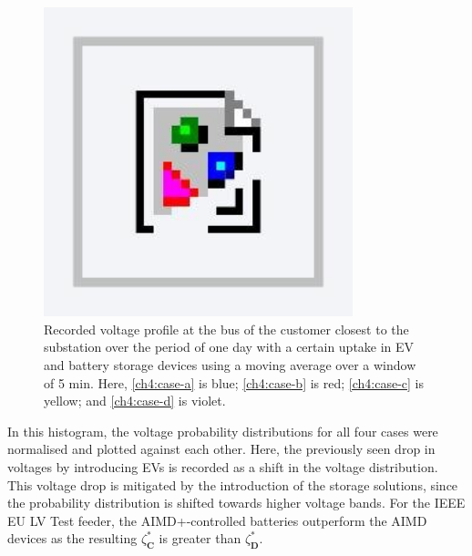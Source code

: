 \begin{figure}\centering
 \includegraphics[width=0.8\textwidth]{foo}
 \caption{Recorded voltage profile at the bus of the customer closest to the substation over the period of one day with a certain uptake in EV and battery storage devices using a moving average over a window of 5 min. Here, \ref{ch4:case-a} is blue; \ref{ch4:case-b} is red; \ref{ch4:case-c} is yellow; and \ref{ch4:case-d} is violet.}
 \label{fig-voltage-profiles-excerpt}
\end{figure}

In this histogram, the voltage probability distributions for all four cases were normalised and plotted against each other. Here, the previously seen drop in voltages by introducing EVs is recorded as a shift in the voltage distribution. This voltage drop is mitigated by the introduction of the storage solutions, since the probability distribution is shifted towards higher voltage bands. For the IEEE EU LV Test feeder, the AIMD+-controlled batteries outperform the AIMD devices as the resulting $\zeta_\textbf{C}^{*}$ is greater than $\zeta_\textbf{D}^{*}$.

